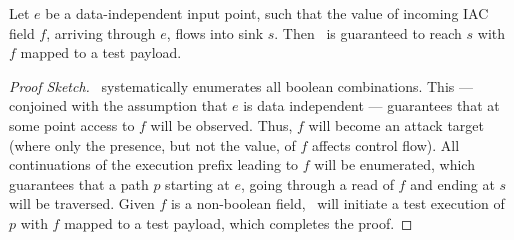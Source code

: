 \begin{lemma}[Coverage] Let $e$ be a data-independent input point, such that the value of incoming IAC field $f$, arriving through $e$, flows into sink $s$. Then \ETool\ is guaranteed to reach $s$ with $f$ mapped to a test payload.
	\begin{proof}[Proof Sketch] \Tool\ systematically enumerates all boolean combinations. This --- conjoined with the assumption that $e$ is data independent --- guarantees that at some point access to $f$ will be observed. Thus, $f$ will become an attack target (where only the presence, but not the value, of $f$ affects control flow). All continuations of the execution prefix leading to $f$ will be enumerated, which guarantees that a path $p$ starting at $e$, going through a read of $f$ and ending at $s$ will be traversed. Given $f$ is a non-boolean field, \Tool\ will initiate a test execution of $p$ with $f$ mapped to a test payload, which completes the proof.
	\end{proof}
\end{lemma}